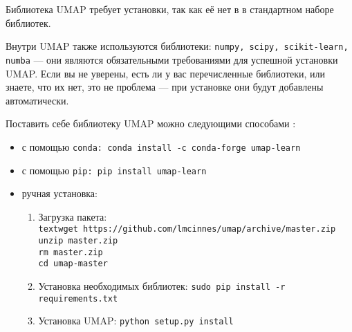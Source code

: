 Библиотека UMAP требует установки, так как её нет в в стандартном наборе библиотек.

Внутри UMAP также используются библиотеки: \verb|numpy, scipy, scikit-learn, numba| --- они являются обязательными требованиями для успешной установки UMAP. Если вы не уверены, есть ли у вас перечисленные библиотеки, или знаете, что их нет, это не проблема --- при установке они будут добавлены автоматически.

Поставить себе библиотеку UMAP можно следующими способами \cite{umap}:
\begin{itemize}
	\item с помощью \verb|conda: conda install -c conda-forge umap-learn|
	\item с помощью \verb|pip: pip install umap-learn|
	\item ручная установка:
	\begin{enumerate}
		\item Загрузка пакета:\\
		\verb|textwget https://github.com/lmcinnes/umap/archive/master.zip| \\
		\verb|unzip master.zip| \\
		\verb|rm master.zip| \\
		\verb|cd umap-master|
		\item Установка необходимых библиотек:
		\verb|sudo pip install -r requirements.txt|
		\item Установка UMAP:
		\verb|python setup.py install|
	\end{enumerate}
\end{itemize} 



